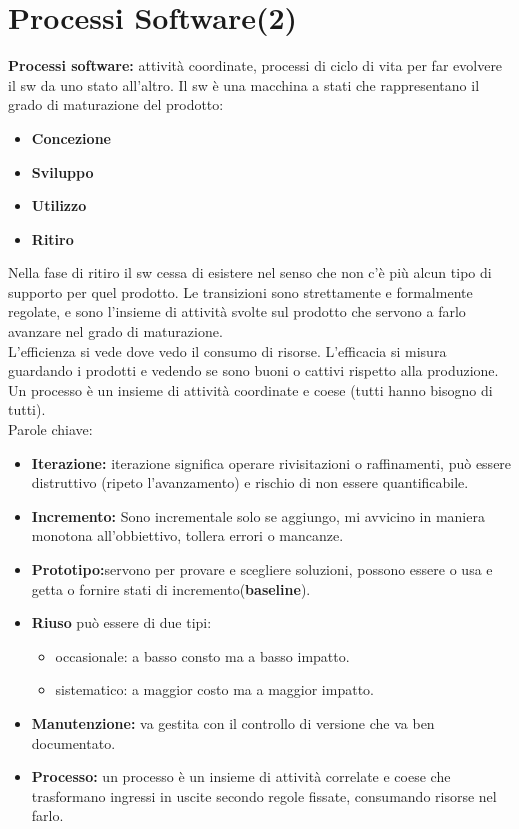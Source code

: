 


\section{Processi Software(2)}
\textbf{Processi software:} attività coordinate, processi di ciclo di vita per far evolvere il sw da uno stato all'altro. Il sw è una macchina a stati che rappresentano il grado di maturazione del prodotto:

\begin{itemize}

	\item \textbf{Concezione}
	\item \textbf{Sviluppo}
	\item \textbf{Utilizzo}
	\item \textbf{Ritiro}

\end{itemize}

Nella fase di ritiro il sw cessa di esistere nel senso che non c'è più alcun tipo di supporto per quel prodotto. Le transizioni sono strettamente e formalmente regolate, e sono l'insieme di attività svolte sul prodotto che servono a farlo avanzare nel grado di maturazione.	\\

L'efficienza si vede dove vedo il consumo di risorse. L'efficacia si misura guardando i prodotti e vedendo se sono buoni o cattivi rispetto alla produzione. Un processo è un insieme di attività coordinate e coese (tutti hanno bisogno di tutti).\\
Parole chiave:
\begin{itemize}
	\item\textbf{Iterazione:} iterazione significa operare rivisitazioni o raffinamenti, può essere distruttivo (ripeto l'avanzamento) e rischio di non essere quantificabile.
	\item\textbf{Incremento:} Sono incrementale solo se aggiungo, mi avvicino in maniera monotona all'obbiettivo, tollera errori o mancanze.
	\item\textbf{Prototipo:}servono per provare e scegliere soluzioni, possono essere o usa e getta o fornire stati di incremento(\textbf{baseline}).
	\item\textbf{Riuso} può essere di due tipi:
	\begin{itemize}
	
		\item occasionale: a basso consto ma a basso impatto.
		\item sistematico: a maggior costo ma a maggior impatto.
	\end{itemize}
	\item \textbf{Manutenzione:} va gestita con il controllo di versione che va ben documentato.
	\item \textbf{Processo:} un processo è un insieme di attività correlate e coese che trasformano ingressi in uscite secondo regole fissate, consumando risorse nel farlo.
\end{itemize}

